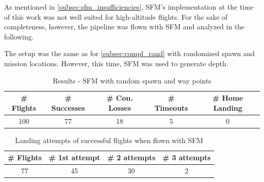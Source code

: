     As mentioned in \cref{subsec:sfm_insufficiencies}, SFM's implementation at the time of this work was not well suited for high-altitude flights. For the sake of completeness, however, the pipeline was flown with SFM and analyzed in the following. 

    The setup was the same as for \cref{subsec:compl_rand} with randomized spawn and mission locations. However, this time, SFM was used to generate depth.

    \begin{table}[h]
        \begin{center}
            \caption{Results - SFM with random spawn and way points}\vspace{1ex}
            \label{tab:result_SFM}
            \begin{tabular}{|c|c|c|c|c|}
            \hline
            \# Flights & \# Successes & \# Con. Losses & \# Timeouts & \# Home Landing\\ \hline \hline
            100 & 77 & 18 & 5 & 0 \\ 
            \hline
            \end{tabular}
        \end{center}
    \end{table}

    \begin{table}[h]
        \begin{center}
            \caption{Landing attempts of successful flights when flown with SFM}\vspace{1ex}
            \label{tab:land_nums_SFM}
            \begin{tabular}{|c|c|c|c|}
            \hline
            \# Flights & \# 1st attempt & \# 2 attempts & \# 3 attempts\\ \hline \hline
            77 & 45 & 30 & 2   \\
            \hline
            \end{tabular}
        \end{center}
    \end{table}

